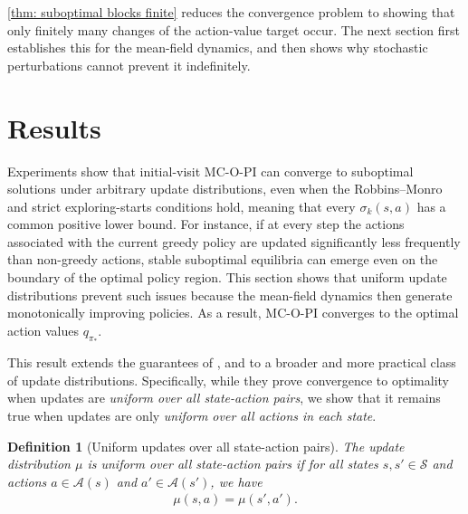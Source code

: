 \documentclass[twoside,11pt]{article}
\newtheorem{definition}[definition]{Definition}
\newcommand{\aset}{\mathcal{A}}
\newcommand{\sset}{\mathcal{S}}
\newcommand{\pol}{\pi}
\newcommand{\update}{\mu}
\newcommand{\qval}{q}
\newcommand{\qopt}{\qval_{\best{\pol}}}
\newcommand{\best}[1]{{#1}_*}
\DeclareRobustCommand{\reviewbarstart}{%
  \ifhmode %
    \vadjust{\vbox to 0pt{%
      \vskip-\ht\strutbox %
      \vskip-\dp\strutbox %
      \cbstart[\changebarwidth] %
      \vss %
    }}%
  \else %
    \cbstart[\changebarwidth]%
  \fi %
} %
\providecommand{\DIFadd}[1]{#1} %
\providecommand{\DIFaddbegin}{\reviewbarstart} %
\providecommand{\DIFaddend}{\protect\cbend} %
\def\DIFadd#1{#1}%
\def\DIFaddbegin{}%
\def\DIFaddend{}%
\begin{document}
\autoref{thm: suboptimal blocks finite}  \DIFaddbegin \DIFadd{reduces the convergence problem to showing that only finitely many changes of the action-value target occur. The next section first establishes this for the mean-field dynamics, and then shows why stochastic perturbations cannot prevent it indefinitely.
}\DIFaddend 

 \section{Results}
\label{sec: results}



Experiments show that initial-visit MC-O-PI can converge to suboptimal solutions under arbitrary update distributions, even when the Robbins–Monro 
and strict exploring-starts conditions hold\DIFaddbegin \DIFadd{, meaning that every $\sigma_k(s,a)$ has a common positive lower bound}\DIFaddend .
For instance, if at every step the actions associated with the current greedy policy are updated significantly less frequently than non-greedy actions, stable suboptimal equilibria can emerge even on the boundary of the optimal policy region.
This section shows that uniform update distributions prevent such issues because the mean-field dynamics then generate monotonically improving policies.
As a result, MC-O-PI converges to the optimal action values $\qopt$.

This result extends the guarantees of \citet{Tsitsiklis2002OnIteration}, \citet{Chen2018OnProblem} and \citet{Liu2021OnStarts} to a broader and more practical class of update distributions.
Specifically, while they prove convergence to optimality when updates are \textit{uniform over all state-action pairs}, we show that it remains true when updates are only \textit{uniform over all actions in each state}.

\begin{definition}[Uniform updates over all state-action pairs]
\label{asp: unbiased tsitsiklis}
The update distribution $\update$ is uniform over all state-action pairs
if for all states $s, s' \in \sset$ and actions $a \in \aset(s)$ and $a' \in \aset(s')$, we have
\begin{align*}
    \mu(s, a) = \mu(s', a') .
\end{align*}
\end{definition}
\end{document}

